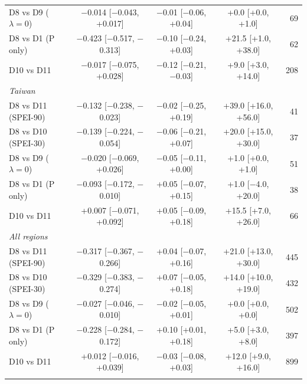 \begin{table}[tbp]
\begin{tabular*}{\textwidth}{@{\extracolsep\fill}lcccr}
\quad D8 vs D9 ($\lambda=0$) & $-$0.014 [$-$0.043, +0.017] & $-$0.01 [$-$0.06, +0.04] & +0.0 [+0.0, +1.0] & 69 \\
\quad D8 vs D1 (P only) & $-$0.423 [$-$0.517, $-$0.313] & $-$0.10 [$-$0.24, +0.03] & +21.5 [+1.0, +38.0] & 62 \\
\quad D10 vs D11 & $-$0.017 [$-$0.075, +0.028] & $-$0.12 [$-$0.21, $-$0.03] & +9.0 [+3.0, +14.0] & 208 \\
\midrule
\multicolumn{5}{l}{\textit{Taiwan}}\\
\quad D8 vs D11 (SPEI-90) & $-$0.132 [$-$0.238, $-$0.023] & $-$0.02 [$-$0.25, +0.19] & +39.0 [+16.0, +56.0] & 41 \\
\quad D8 vs D10 (SPEI-30) & $-$0.139 [$-$0.224, $-$0.054] & $-$0.06 [$-$0.21, +0.07] & +20.0 [+15.0, +30.0] & 37 \\
\quad D8 vs D9 ($\lambda=0$) & $-$0.020 [$-$0.069, +0.026] & $-$0.05 [$-$0.11, +0.00] & +1.0 [+0.0, +1.0] & 51 \\
\quad D8 vs D1 (P only) & $-$0.093 [$-$0.172, $-$0.010] & +0.05 [$-$0.07, +0.15] & +1.0 [$-$4.0, +20.0] & 38 \\
\quad D10 vs D11 & +0.007 [$-$0.071, +0.092] & +0.05 [$-$0.09, +0.18] & +15.5 [+7.0, +26.0] & 66 \\
\midrule
\multicolumn{5}{l}{\textit{All regions}}\\
\quad D8 vs D11 (SPEI-90) & $-$0.317 [$-$0.367, $-$0.266] & +0.04 [$-$0.07, +0.16] & +21.0 [+13.0, +30.0] & 445 \\
\quad D8 vs D10 (SPEI-30) & $-$0.329 [$-$0.383, $-$0.274] & +0.07 [$-$0.05, +0.18] & +14.0 [+10.0, +19.0] & 432 \\
\quad D8 vs D9 ($\lambda=0$) & $-$0.027 [$-$0.046, $-$0.010] & $-$0.02 [$-$0.05, +0.01] & +0.0 [+0.0, +0.0] & 502 \\
\quad D8 vs D1 (P only) & $-$0.228 [$-$0.284, $-$0.172] & +0.10 [+0.01, +0.18] & +5.0 [+3.0, +8.0] & 397 \\
\quad D10 vs D11 & +0.012 [$-$0.016, +0.039] & $-$0.03 [$-$0.08, +0.03] & +12.0 [+9.0, +16.0] & 899 \\
\botrule
\end{tabular*}
\end{table}
